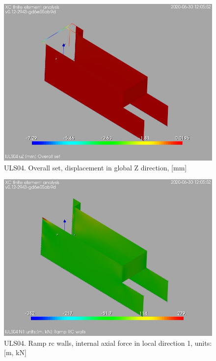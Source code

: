 \begin{figure}
\begin{center}
\includegraphics[width=\linewidth]{ramp_wall/resLC/text/graphics/resSimplLC/lULS04overallSetuZ}
\caption{ULS04. Overall set, displacement in global Z direction, [mm]}
\end{center}
\end{figure}
\begin{figure}
\begin{center}
\includegraphics[width=\linewidth]{ramp_wall/resLC/text/graphics/resSimplLC/lULS04wallsN1}
\caption{ULS04. Ramp rc walls, internal axial force in local direction 1, units:[m, kN]}
\end{center}
\end{figure}
